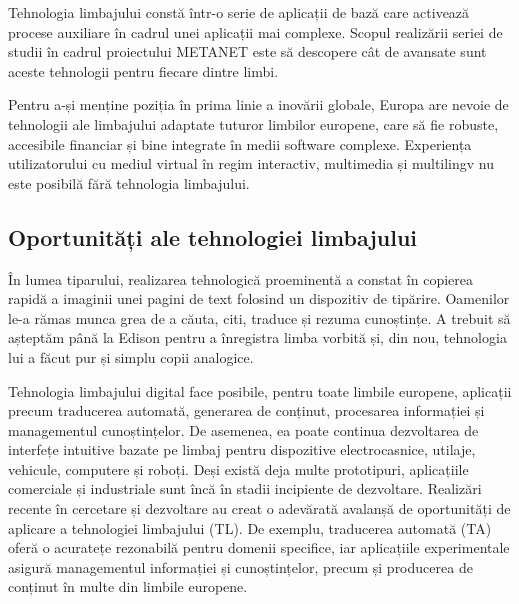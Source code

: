 \begin{multicols}{2}
Tehnologia limbajului constă într-o serie de aplicații de bază care activează procese auxiliare în cadrul unei aplicații mai complexe. Scopul realizării seriei de studii în cadrul proiectului METANET este să descopere cât de avansate sunt aceste tehnologii pentru fiecare dintre limbi. 


Pentru a-și menține poziția în prima linie a inovării globale, Europa are nevoie de tehnologii ale limbajului adaptate tuturor limbilor europene, care să fie robuste, accesibile financiar și bine integrate în medii software complexe. Experiența utilizatorului cu mediul virtual în regim interactiv, multimedia și multilingv nu este posibilă fără tehnologia limbajului.

\subsection{Oportunități ale tehnologiei limbajului}

În lumea tiparului, realizarea tehnologică proeminentă a constat în copierea rapidă a imaginii unei pagini de text folosind un dispozitiv de tipărire. Oamenilor le-a rămas munca grea de a căuta, citi, traduce și rezuma cunoștințe. A trebuit să așteptăm până la Edison pentru a înregistra limba vorbită și, din nou, tehnologia lui a făcut pur și simplu copii analogice.

Tehnologia limbajului digital face posibile, pentru toate limbile europene, aplicații precum traducerea automată, generarea de conținut, procesarea informației și managementul cunoștințelor. De asemenea, ea poate continua dezvoltarea de interfețe intuitive bazate pe limbaj pentru dispozitive electrocasnice, utilaje, vehicule, computere și roboți. Deși există deja multe prototipuri, aplicațiile comerciale și industriale sunt încă în stadii incipiente de dezvoltare. Realizări recente în cercetare și dezvoltare au creat o adevărată avalanșă de oportunități de aplicare a tehnologiei limbajului (TL). De exemplu, traducerea automată (TA) oferă o acuratețe rezonabilă pentru domenii specifice, iar aplicațiile experimentale asigură managementul informației și cunoștințelor, precum și producerea de conținut în multe din limbile europene. 


\end{multicols}
